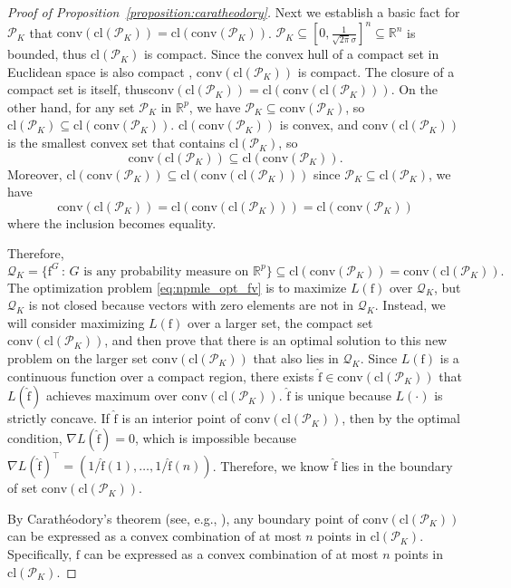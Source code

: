 \documentclass[11pt]{article}
\numberwithin{equation}{section}
\newcommand{\RS}{\mathbb{R}}
\newcommand{\PS}{\mathcal{P}}
\newcommand{\QS}{\mathcal{Q}}
\newcommand{\T}{ \top }
\newcommand{\fv}{\mathrm{f}}
\begin{document}
\begin{appendices}
\begin{proof}[Proof of Proposition~\ref{proposition:caratheodory}]
Next we establish a basic fact for $\PS_K$ that $\mathrm{conv}(\mathrm{cl}(\PS_K)) = \mathrm{cl}(\mathrm{conv}(\PS_K))$. $\PS_K \subseteq [0,\frac{1}{\sqrt{2\pi} \sigma}]^{n}\subseteq \RS^n$ is bounded, thus $\mathrm{cl}(\PS_K)$ is compact. Since the convex hull of a compact set in Euclidean space is also compact \citep[Proposition 1.3.2]{bertsekas2003convex}, $\mathrm{conv}(\mathrm{cl}(\PS_K))$ is compact. The closure of a compact set is itself, thus$
 \mathrm{conv}(\mathrm{cl}(\PS_K)) = \mathrm{cl}(\mathrm{conv}(\mathrm{cl}(\PS_K))).$ On the other hand, for any set $\PS_K$ in $\RS^p$,  we have $\PS_K\subseteq \mathrm{conv}(\PS_K)$, so $\mathrm{cl}(\PS_K) \subseteq \mathrm{cl}(\mathrm{conv}(\PS_K))$. $\mathrm{cl}(\mathrm{conv}(\PS_K))$ is convex, and $\mathrm{conv}(\mathrm{cl}(\PS_K))$ is the smallest convex set that contains $\mathrm{cl}(\PS_K) $, so
\[
\mathrm{conv}(\mathrm{cl}(\PS_K)) \subseteq \mathrm{cl}(\mathrm{conv}(\PS_K)).
\]
Moreover, $\mathrm{cl}(\mathrm{conv}(\PS_K))\subseteq \mathrm{cl}(\mathrm{conv}(\mathrm{cl}(\PS_K))) $ since $\PS_K \subseteq \mathrm{cl}(\PS_K)$, we have 
\[
\mathrm{conv}(\mathrm{cl}(\PS_K)) = \mathrm{cl}(\mathrm{conv}(\mathrm{cl}(\PS_K)))  = \mathrm{cl}(\mathrm{conv}(\PS_K))
\]
where the inclusion becomes equality.

Therefore,
\[
\QS_K=\{\fv^G \,:\, G \text{ is any probability measure on } \RS^p\} \subseteq \mathrm{cl}(\mathrm{conv}(\PS_K)) = \mathrm{conv}(\mathrm{cl}(\PS_K)).
\]
The optimization problem \eqref{eq:npmle_opt_fv} is to maximize $L(\fv)$ over $\QS_K$, but $\QS_K$ is not closed because vectors with zero elements are not in $\QS_K$. Instead, we will consider maximizing $L(\fv)$ over a larger set, the compact set $\mathrm{conv}(\mathrm{cl}(\PS_K))$, and then prove that there is an optimal solution to this new problem on the larger set $\mathrm{conv}(\mathrm{cl}(\PS_K))$ that also lies in $\QS_K$. Since $L(\fv)$ is a continuous function over a compact region, there exists $\hat{\fv}\in \mathrm{conv}(\mathrm{cl}(\PS_K))$ that $L(\hat{\fv})$ achieves maximum over $\mathrm{conv}(\mathrm{cl}(\PS_K))$. $\hat{\fv}$ is unique because $L(\cdot)$ is strictly concave. 
If $\hat{\fv}$ is an interior point of $\mathrm{conv}(\mathrm{cl}(\PS_K))$, then by the optimal condition, $\nabla L(\hat{\fv}) = 0$, which is impossible because $\nabla L(\hat{\fv})^\T = ({1}/{\hat{\fv}(1)}, \dots, {1}/{\hat{\fv}(n)})$. Therefore, we know $\hat{\fv}$ lies in the boundary of set $\mathrm{conv}(\mathrm{cl}(\PS_K))$.


By Carath\'eodory's theorem (see, e.g., \citet[Appendix 2]{silvey1980optimal}), any boundary point of $\mathrm{conv}(\mathrm{cl}(\PS_K))$ can be expressed as a convex combination of at most $n$ points in $\mathrm{cl}(\PS_K)$. Specifically, $\hat{\fv}$ can be expressed as a convex combination of at most $n$ points in $\mathrm{cl}(\PS_K)$.


\end{proof}
\end{appendices}
\end{document}
